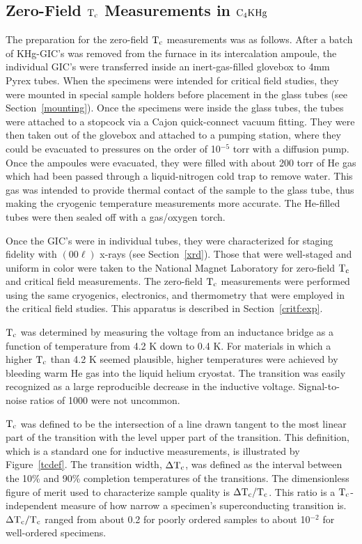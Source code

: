 \subsection{Zero-Field $\rm T_c$ Measurements in $\rm C_4KHg$}
\label{zerof}

        The  preparation for the  zero-field  $\rm T_c$ measurements was as
follows.  After a  batch of KHg-GIC's  was removed from  the furnace in its
intercalation  ampoule,  the  individual  GIC's were transferred  inside an
inert-gas-filled glovebox to 4mm   Pyrex tubes.  When  the  specimens  were
intended for  critical  field studies, they were  mounted in special sample
holders before placement in  the glass tubes  (see Section~\ref{mounting}).
Once the specimens  were  inside  the glass tubes,  the tubes were attached  to a
stopcock via  a Cajon quick-connect vacuum fitting.    They were then taken
out of the glovebox and attached to a  pumping station, where they could be
evacuated to  pressures on the  order of 10$^{-5}$   torr with a  diffusion
pump.   Once the ampoules were evacuated,  they were  filled with about 200
torr of He gas which had been passed through a liquid-nitrogen cold trap to
remove water.  This gas  was intended  to  provide  thermal contact of  the
sample   to  the  glass  tube,   thus   making   the cryogenic  temperature
measurements more accurate.  The He-filled tubes were then  sealed off with
a gas/oxygen torch.

        Once the GIC's were  in individual  tubes, they  were characterized
for staging fidelity with $(00\ell)$ x-rays (see Section~\ref{xrd}).  Those
that  were well-staged   and uniform in   color  were taken to the National
Magnet Laboratory  for  zero-field $\rm T_c$   and
critical field measurements.  The zero-field $\rm T_c$ measurements
were performed using the same cryogenics, electronics, and thermometry that
were employed in the critical field studies.  This apparatus is described
in Section~\ref{critf:exp}.

        $\rm  T_c$   was determined  by measuring     the voltage  from  an
inductance bridge as a function of  temperature  from 4.2  K down to 0.4 K.
For  materials  in which a higher  $\rm T_c$ than  4.2 K  seemed plausible,
higher temperatures were achieved  by bleeding  warm He gas into the liquid
helium   cryostat.  The  transition   was  easily  recognized   as  a large
reproducible decrease in  the inductive voltage.  Signal-to-noise ratios of
1000 were not uncommon.

        $\rm  T_c$ was  defined   to  be the  intersection of  a line drawn
tangent to the most linear part of the transition with the level upper part
of the transition.  This definition, which  is a standard one for inductive
measurements,\cite{iye82}   is   illustrated  by  Figure~\ref{tcdef}.   The
transition width, $\rm \Delta T_c$, was defined  as the interval between the
10\% and 90\% completion temperatures of the transitions.  The
dimensionless figure of merit used to characterize sample quality is $\rm
\Delta T_c/T_c$.  This ratio is a $\rm T_c$-independent measure of how
narrow a specimen's superconducting transition  is.  $\rm \Delta  T_c/ T_c$
ranged from  about 0.2 for poorly ordered  samples  to about  10$^{-2}$ for
well-ordered specimens.

